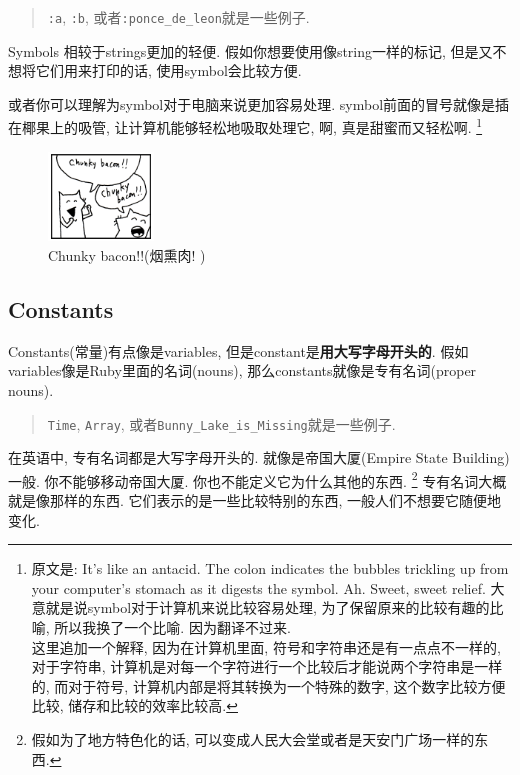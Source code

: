 \begin{quotation}
  \texttt{:a}, \texttt{:b}, 或者\texttt{:ponce_de_leon}就是一些例子. 
\end{quotation}

Symbols 相较于strings更加的轻便. 假如你想要使用像string一样的标记, 
但是又不想将它们用来打印的话, 使用symbol会比较方便. 

或者你可以理解为symbol对于电脑来说更加容易处理. 
symbol前面的冒号就像是插在椰果上的吸管, 让计算机能够轻松地吸取处理它, 
啊, 真是甜蜜而又轻松啊. 
\footnote{原文是: It's like an antacid. The colon indicates the bubbles trickling up from your computer's stomach as it digests the symbol. Ah. Sweet, sweet relief. 大意就是说symbol对于计算机来说比较容易处理, 为了保留原来的比较有趣的比喻, 所以我换了一个比喻. 因为翻译不过来. \\这里追加一个解释, 因为在计算机里面, 符号和字符串还是有一点点不一样的, 对于字符串, 计算机是对每一个字符进行一个比较后才能说两个字符串是一样的, 而对于符号, 计算机内部是将其转换为一个特殊的数字, 这个数字比较方便比较, 储存和比较的效率比较高. }

\begin{figure}[h]
  \centering
  \includegraphics[width=0.25\textwidth]{image/why/foxes-4c.png}
  \caption{Chunky bacon!!(烟熏肉! )}
\end{figure}

\subsection*{Constants}
Constants(常量)有点像是variables, 
但是constant是\textbf{用大写字母开头的}. 
假如variables像是Ruby里面的名词(nouns), 那么constants就像是专有名词(proper nouns). 

\begin{quotation}
  \texttt{Time}, \texttt{Array}, 或者\texttt{Bunny_Lake_is_Missing}就是一些例子. 
\end{quotation}

在英语中, 专有名词都是大写字母开头的. 就像是帝国大厦(Empire State Building)一般. 你不能够移动帝国大厦. 你也不能定义它为什么其他的东西. 
\footnote{假如为了地方特色化的话, 可以变成人民大会堂或者是天安门广场一样的东西. }
专有名词大概就是像那样的东西. 它们表示的是一些比较特别的东西, 
一般人们不想要它随便地变化. 


